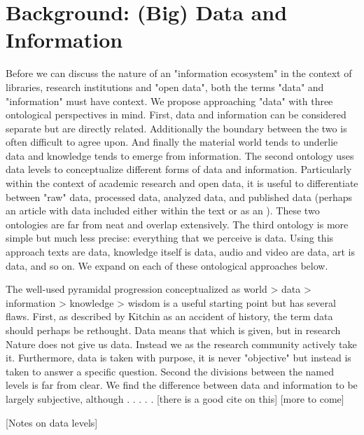 \section{Background: (Big) Data and Information}

Before we can discuss the nature of an "information ecosystem" in the context of libraries, research institutions and "open data", both the terms "data" and "information" must have context. We propose approaching "data" with three ontological perspectives in mind. First, data and information can be considered separate but are directly related. Additionally the boundary between the two is often difficult to agree upon. And finally the material world tends to underlie data and knowledge tends to emerge from information. The second ontology uses data levels to conceptualize different forms of data and information. Particularly within the context of academic research and open data, it is useful to differentiate between "raw" data, processed data, analyzed data, and published data (perhaps an article with data included either within the text or as an ). These two ontologies are far from neat and overlap extensively. The third ontology is more simple but much less precise: everything that we perceive is data. Using this approach texts are data, knowledge itself is data, audio and video are data, art is data, and so on. We expand on each of these ontological approaches below.

The well-used pyramidal progression conceptualized as world > data > information > knowledge > wisdom is a useful starting point but has several flaws. First, as described by Kitchin as an accident of history, the term data should perhaps be rethought. Data means that which is given, but in research Nature does not give us data. Instead we as the research community actively take it. Furthermore, data is taken with purpose, it is never "objective" but instead is taken to answer a specific question. Second the divisions between the named levels is far from clear. We find the difference between data and information to be largely subjective, although  . . . . . [there is a good cite on this] [more to come]

[Notes on data levels]